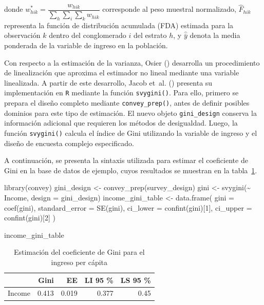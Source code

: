 \documentclass[
  spanish,
  11pt,
  letterpaper,
  oneside,
  open=any]{scrbook}
\newenvironment{Shaded}{\begin{snugshade}}{\end{snugshade}}
\newcommand{\AttributeTok}[1]{\textcolor[rgb]{0.40,0.45,0.13}{#1}}
\newcommand{\DecValTok}[1]{\textcolor[rgb]{0.68,0.00,0.00}{#1}}
\newcommand{\FunctionTok}[1]{\textcolor[rgb]{0.28,0.35,0.67}{#1}}
\newcommand{\NormalTok}[1]{\textcolor[rgb]{0.00,0.23,0.31}{#1}}
\newcommand{\OtherTok}[1]{\textcolor[rgb]{0.00,0.23,0.31}{#1}}
\newcommand{\SpecialCharTok}[1]{\textcolor[rgb]{0.37,0.37,0.37}{#1}}
\begin{document}
donde \(w_{hik}^{*}=\dfrac{w_{hik}}{\sum_{h}\sum_{i}\sum_{k}w_{hik}}\)
corresponde al peso muestral normalizado, \(\hat{F}_{hik}\) representa
la función de distribución acumulada (FDA) estimada para la observación
\(k\) dentro del conglomerado \(i\) del estrato \(h\), y
\(\hat{\bar{y}}\) denota la media ponderada de la variable de ingreso en
la población.

Con respecto a la estimación de la varianza, Osier
() desarrolla un procedimiento de
linealización que aproxima el estimador no lineal mediante una variable
linealizada. A partir de este desarrollo, Jacob et~al.
() presenta su implementación en
\texttt{R} mediante la función \texttt{svygini()}. Para ello, primero se
prepara el diseño completo mediante \texttt{convey\_prep()}, antes de
definir posibles dominios para este tipo de estimación. El nuevo objeto
\texttt{gini\_design} conserva la información adicional que requieren
los métodos de desigualdad. Luego, la función \texttt{svygini()} calcula
el índice de Gini utilizando la variable de ingreso y el diseño de
encuesta complejo especificado.

A continuación, se presenta la sintaxis utilizada para estimar el
coeficiente de Gini en la base de datos de ejemplo, cuyos resultados se
muestran en la tabla~\ref{tbl-gini}.

\begin{Shaded}
\begin{Highlighting}[]
\FunctionTok{library}\NormalTok{(convey)}
\NormalTok{gini\_design }\OtherTok{\textless{}{-}} \FunctionTok{convey\_prep}\NormalTok{(survey\_design)}
\NormalTok{gini }\OtherTok{\textless{}{-}} \FunctionTok{svygini}\NormalTok{(}\SpecialCharTok{\textasciitilde{}}\NormalTok{ Income, }\AttributeTok{design =}\NormalTok{ gini\_design)}
\NormalTok{income\_gini\_table }\OtherTok{\textless{}{-}} \FunctionTok{data.frame}\NormalTok{(}
  \AttributeTok{gini =} \FunctionTok{coef}\NormalTok{(gini),}
  \AttributeTok{standard\_error =} \FunctionTok{SE}\NormalTok{(gini),}
  \AttributeTok{ci\_lower =} \FunctionTok{confint}\NormalTok{(gini)[}\DecValTok{1}\NormalTok{],}
  \AttributeTok{ci\_upper =} \FunctionTok{confint}\NormalTok{(gini)[}\DecValTok{2}\NormalTok{]}
\NormalTok{)}

\NormalTok{income\_gini\_table}
\end{Highlighting}
\end{Shaded}

{

\begin{longtable}[]{@{}lrrrr@{}}

\caption{\label{tbl-gini}Estimación del coeficiente de Gini para el
ingreso per cápita}

\tabularnewline

\toprule\noalign{}
& Gini & EE & LI 95 \% & LS 95 \% \\
\midrule\noalign{}
\endhead
\bottomrule\noalign{}
\endlastfoot
Income & 0.413 & 0.019 & 0.377 & 0.45 \\

\end{longtable}

}
\end{document}
